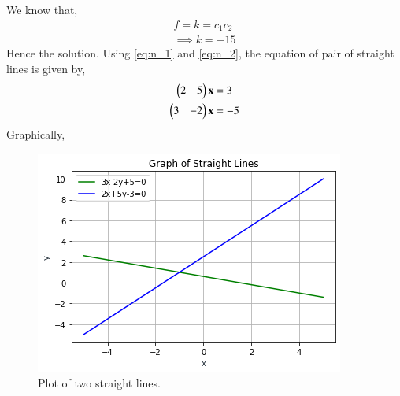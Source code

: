 \documentclass[journal,12pt,twocolumn]{IEEEtran}
\begin{document}
We know that,
\begin{align}
	f = k = c_1c_2\\
	\implies \boxed{k = -15}
\end{align}
Hence the solution. Using \eqref{eq:n_1} and \eqref{eq:n_2}, the equation of pair of straight lines is given by,
\begin{align}
\begin{pmatrix}2 & 5\end{pmatrix}\mathbf{x} &= 3\\
\begin{pmatrix}3 & -2\end{pmatrix}\mathbf{x} &= -5
\end{align}
Graphically,
\renewcommand{\thefigure}{\arabic{figure}}
\begin{figure}[!ht] \label{fig:straight_lines}
	\centering
	\includegraphics[width=\columnwidth]{a6_graph.png}
	\caption{Plot of two straight lines.}
\end{figure}
\end{document}
